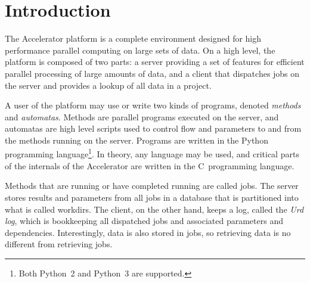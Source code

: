 
\section{Introduction}

The Accelerator platform is a complete environment designed for high
performance parallel computing on large sets of data.  On a high
level, the platform is composed of two parts: a server providing a set
of features for efficient parallel processing of large amounts of
data, and a client that dispatches jobs on the server and provides a
lookup of all data in a project.

A user of the platform may use or write two kinds of programs, denoted
\textsl{methods} and \textsl{automatas}.  Methods are parallel
programs executed on the server, and automatas are high level scripts
used to control flow and parameters to and from the methods running on
the server.  Programs are written in the Python programming
language\footnote{Both Python~2 and Python~3 are supported.}.  In
theory, any language may be used, and critical parts of the internals
of the Accelerator are written in the C~programming language.

Methods that are running or have completed running are called jobs.
The server stores results and parameters from all jobs in a database
that is partitioned into what is called workdirs.  The client, on the
other hand, keeps a log, called the \textsl{Urd log}, which is
bookkeeping all dispatched jobs and associated parameters and
dependencies.  Interestingly, data is also stored in jobs, so
retrieving data is no different from retrieving jobs.


